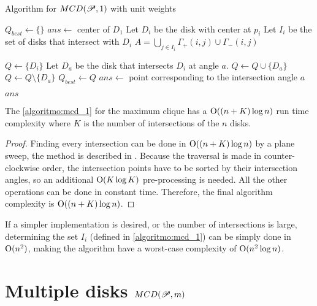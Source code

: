 \begin{algoritmo}
\caption{Algorithm for $MCD(\mathscr{P}, 1)$ with unit weights}\label{algoritmo:mcd_1}
\begin{algorithmic}[1]
\State $Q_{best} \gets \{\}$
\State $ans \gets$ center of $D_1$
\State Let $D_i$ be the disk with center at $p_i$
\State Let $I_i$ be the set of disks that intersect with $D_i$
\State $A = \bigcup_{j \in I_i} \Gamma_+(i,j) \cup \Gamma_-(i,j)$

\State $Q \gets \{D_i\}$ 
 
\State Let $D_a$ be the disk that intersects $D_i$ at angle $a$. 
\State $Q \gets Q \cup \{D_a\}$
\Else
\State $Q \gets Q \setminus \{D_a\}$
\EndIf
{}
\State $Q_{best} \gets Q$
\State $ans \gets $ point corresponding to the intersection angle $a$
\EndIf
\EndFor
\EndFor
\EndFor

\State \Return $ans$
\EndProcedure
\end{algorithmic}
\end{algoritmo}

\begin{lema}\label{lema:disk}
The \autoref{algoritmo:mcd_1} for the maximum clique has a $\mathrm{O}((n+K)\log{n})$ run time complexity where $K$ is the number of intersections of the $n$ disks.
\end{lema}

\begin{proof}
    Finding every intersection can be done in $\mathrm{O}((n+K)\log{n})$  by a plane sweep, the method is described in \cite{bentley:1979}. 
    Because the traversal is made in counter-clockwise order, the intersection points have to be sorted by their intersection angles, so an additional $\mathrm{O}(K\log{K})$ pre-processing is needed. All the other operations can be done in constant time. Therefore, the final algorithm complexity is $\mathrm{O}((n+K)\log{n})$.
\end{proof}

If a simpler implementation is desired, or the number of intersections is large, determining the set $I_i$ (defined in \autoref{algoritmo:mcd_1}) can be simply done in $\mathrm{O}(n^2)$, making the algorithm have a worst-case complexity of $\mathrm{O}(n^2\log{n})$.

\section{Multiple disks $MCD(\mathscr{P}, m)$}

